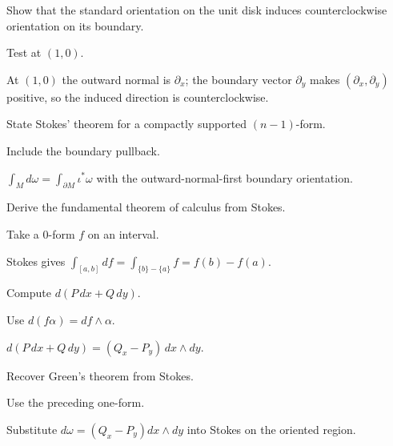 \begin{exercise}\label{exr:vii11-04}
Show that the standard orientation on the unit disk induces counterclockwise orientation on its boundary.
\end{exercise}
\begin{hint}
Test at $(1,0)$.
\end{hint}
\begin{solution}
At $(1,0)$ the outward normal is $\partial_x$; the boundary vector $\partial_y$ makes $(\partial_x,\partial_y)$ positive, so the induced direction is counterclockwise.
\end{solution}

\begin{exercise}\label{exr:vii11-05}
State Stokes' theorem for a compactly supported $(n-1)$-form.
\end{exercise}
\begin{hint}
Include the boundary pullback.
\end{hint}
\begin{solution}
$\int_Md\omega=\int_{\partial M}\iota^*\omega$ with the outward-normal-first boundary orientation.
\end{solution}

\begin{exercise}\label{exr:vii11-06}
Derive the fundamental theorem of calculus from Stokes.
\end{exercise}
\begin{hint}
Take a $0$-form $f$ on an interval.
\end{hint}
\begin{solution}
Stokes gives $\int_{[a,b]}df=\int_{\{b\}-\{a\}}f=f(b)-f(a)$.
\end{solution}

\begin{exercise}\label{exr:vii11-07}
Compute $d(P\,dx+Q\,dy)$.
\end{exercise}
\begin{hint}
Use $d(f\alpha)=df\wedge\alpha$.
\end{hint}
\begin{solution}
$d(P\,dx+Q\,dy)=(Q_x-P_y)\,dx\wedge dy$.
\end{solution}

\begin{exercise}\label{exr:vii11-08}
Recover Green's theorem from Stokes.
\end{exercise}
\begin{hint}
Use the preceding one-form.
\end{hint}
\begin{solution}
Substitute $d\omega=(Q_x-P_y)dx\wedge dy$ into Stokes on the oriented region.
\end{solution}

